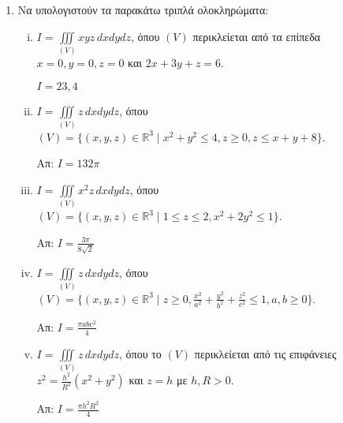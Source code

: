 


\everymath{\displaystyle}
\thispagestyle{empty}





\begin{center}
\end{center}

\vspace{\baselineskip}

\begin{enumerate}
  \item Να υπολογιστούν τα παρακάτω τριπλά ολοκληρώματα:
  \begin{enumerate}[i)]
    \item $I=\iiint\limits_{(V)}xyz\,dxdydz$, όπου $(V)$ περικλείεται από τα επίπεδα $x=0, y=0, z=0$ και $2x+3y+z=6$.

    \hfill $I=23,4$

    \item $I=\iiint\limits_{(V)}z\,dxdydz$, όπου $(V)=\{(x,y,z)\in \mathbb{R}^{3} \mid x^{2}+y^{2}\leq 4, z\geq 0, z\leq x+y+8\}$.

    \hfill Απ: $I=132\pi$

    \item $I=\iiint\limits_{(V)}x^{2}z\,dxdydz$, όπου $(V)=\{(x,y,z)\in \mathbb{R}^{3} \mid 1\leq z\leq 2, x^{2}+2y^{2}\leq 1\}$.

    \hfill Απ: $I=\frac{3\pi}{8\sqrt{2}}$

    \item $I=\iiint\limits_{(V)}z\,dxdydz$, όπου $(V)=\{(x,y,z)\in \mathbb{R}^{3} \mid z\geq 0, \frac{x^{2}}{a^{2}}+\frac{y^{2}}{b^{2}}+\frac{z^{2}}{c^{2}}\leq 1, a,b\geq 0\}$.

    \hfill Απ: $I=\frac{\pi abc^{2}}{4}$

    \item $I=\iiint\limits_{(V)}z\,dxdydz$, όπου το $(V)$ περικλείεται από τις επιφάνειες $z^{2}=\frac{h^{2}}{R^{2}}(x^{2}+y^{2})$ και $z=h$ με $h,R>0$.

    \hfill Απ: $I=\frac{\pi h^{2}R^{2}}{4}$
  \end{enumerate}
\end{enumerate}


